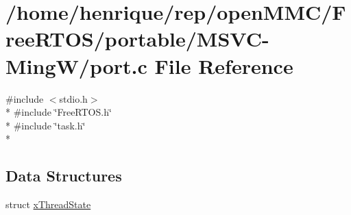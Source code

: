 \hypertarget{MSVC-MingW_2port_8c}{\section{/home/henrique/rep/open\-M\-M\-C/\-Free\-R\-T\-O\-S/portable/\-M\-S\-V\-C-\/\-Ming\-W/port.c File Reference}
\label{MSVC-MingW_2port_8c}
}
{\ttfamily \#include $<$stdio.\-h$>$}\\*
{\ttfamily \#include \char`\"{}Free\-R\-T\-O\-S.\-h\char`\"{}}\\*
{\ttfamily \#include \char`\"{}task.\-h\char`\"{}}\\*
\subsection*{Data Structures}
\begin{DoxyCompactItemize}
\item 
struct \hyperlink{structxThreadState}{x\-Thread\-State}
\end{DoxyCompactItemize}
